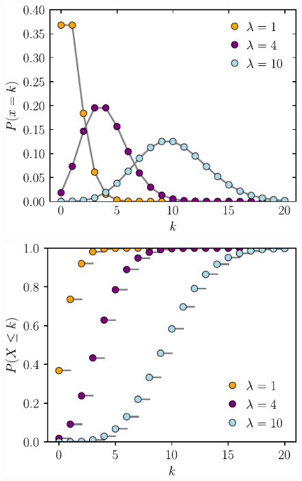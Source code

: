 \documentclass[12pt, a4paper]{article}
\begin{document}
    \begin{figure}[!ht]
        \centering
        \begin{minipage}{.5\textwidth}
            \centering
            \includegraphics[width=.95\linewidth]{pdf/pmf.pdf}
            \label{fig:test1}
        \end{minipage}%
        \begin{minipage}{.5\textwidth}
            \centering
            \includegraphics[width=.95\linewidth]{pdf/cdf.pdf}
            \label{fig:test2}
        \end{minipage}
    \end{figure}
\end{document}

